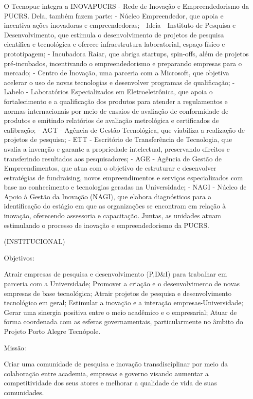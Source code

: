 O Tecnopuc integra a INOVAPUCRS - Rede de Inovação e Empreendedorismo da PUCRS. Dela, também fazem parte:
- Núcleo Empreendedor, que apoia e incentiva ações inovadoras e empreendedoras;
- Ideia - Instituto de Pesquisa e Desenvolvimento, que estimula o desenvolvimento de projetos de pesquisa científica e tecnológica e oferece infraestrutura laboratorial, espaço físico e prototipagem;
- Incubadora Raiar, que abriga startups, spin-offs, além de projetos pré-incubados, incentivando o empreendedorismo e preparando empresas para o mercado;
- Centro de Inovação, uma parceria com a Microsoft, que objetiva acelerar o uso de novas tecnologias e desenvolver programas de qualificação;
- Labelo - Laboratórios Especializados em Eletroeletrônica, que apoia o fortalecimento e a qualificação dos produtos para atender a regulamentos e normas internacionais por meio de ensaios de avaliação de conformidade de produtos e emitindo relatórios de avaliação metrológica e certificados de calibração;
- AGT - Agência de Gestão Tecnológica, que viabiliza a realização de projetos de pesquisa;
- ETT - Escritório de Transferência de Tecnologia, que avalia a invenção e garante a propriedade intelectual, preservando direitos e transferindo resultados aos pesquisadores;
- AGE - Agência de Gestão de Empreendimentos, que atua com o objetivo de estruturar e desenvolver estratégias de fundraising, novos empreendimentos e serviços especializados com base no conhecimento e tecnologias geradas na Universidade;
- NAGI - Núcleo de Apoio à Gestão da Inovação (NAGI), que elabora diagnósticos para a identificação do estágio em que as organizações se encontram em relação à inovação, oferecendo assessoria e capacitação.
Juntas, as unidades atuam estimulando o processo de inovação e empreendedorismo da PUCRS.

(INSTITUCIONAL)

Objetivos: 

Atrair empresas de pesquisa e desenvolvimento (P,D&I) para trabalhar em parceria com a Universidade;
Promover a criação e o desenvolvimento de novas empresas de base tecnológica;
Atrair projetos de pesquisa e desenvolvimento tecnológico em geral;
Estimular a inovação e a interação empresas-Universidade;
Gerar uma sinergia positiva entre o meio acadêmico e o empresarial;
Atuar de forma coordenada com as esferas governamentais, particularmente no âmbito do Projeto Porto Alegre Tecnópole.

Missão:

Criar uma comunidade de pesquisa e inovação transdisciplinar por meio da colaboração entre academia, empresas e governo visando aumentar a competitividade dos seus atores e melhorar a qualidade de vida de suas comunidades.

